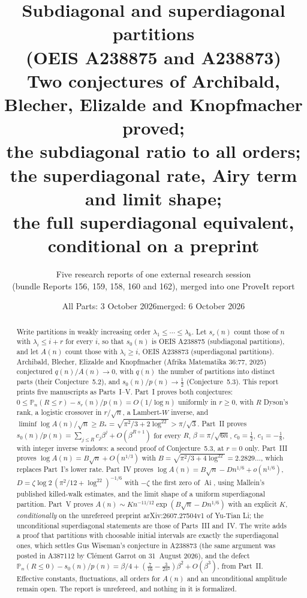 \documentclass[11pt,letterpaper]{article}
\title{\textbf{Subdiagonal and superdiagonal partitions\\ (OEIS A238875 and A238873)}\\[7pt]
\large Two conjectures of Archibald, Blecher, Elizalde and Knopfmacher proved;\\ the subdiagonal ratio to all orders; the superdiagonal rate, Airy term and limit shape;\\ the full superdiagonal equivalent, conditional on a preprint}
\author{Five research reports of one external research session\\(bundle Reports 156, 159, 158, 160 and 162), merged into one ProveIt report}
\date{All Parts: 3 October 2026\quad merged: 6 October 2026}
\numberwithin{equation}{section}
\theoremstyle{remark}\newtheorem{remark}[theorem]{Remark}
\begin{document}
\hypersetup{pageanchor=false}
\maketitle
\begin{abstract}
Write partitions in weakly increasing order $\lambda_1\le\cdots\le\lambda_k$. Let $s_r(n)$ count those of $n$ with $\lambda_i\le i+r$ for every $i$, so that $s_0(n)$ is OEIS A238875 (subdiagonal partitions), and let $A(n)$ count those with $\lambda_i\ge i$, OEIS A238873 (superdiagonal partitions). Archibald, Blecher, Elizalde and Knopfmacher (Afrika Matematika 36:77, 2025) conjectured $q(n)/A(n)\to0$, with $q(n)$ the number of partitions into distinct parts (their Conjecture~5.2), and $s_0(n)/p(n)\to\frac12$ (Conjecture~5.3). This report prints five manuscripts as Parts~I--V. Part~I proves both conjectures: $0\le\mathbb P_n(R\le r)-s_r(n)/p(n)=O(1/\log n)$ uniformly in $r\ge0$, with $R$ Dyson's rank, a logistic crossover in $r/\sqrt n$, a Lambert-$W$ inverse, and $\liminf\log A(n)/\sqrt n\ge B_*=\sqrt{\pi^2/3+2\log^22}>\pi/\sqrt3$. Part~II proves $s_0(n)/p(n)=\sum_{j\le R}c_j\beta^j+O(\beta^{R+1})$ for every $R$, $\beta=\pi/\sqrt{6n}$, $c_0=\frac12$, $c_1=-\frac18$, with integer inverse windows: a second proof of Conjecture~5.3, at $r=0$ only. Part~III proves $\log A(n)=B\sqrt n+O(n^{1/3})$ with $B=\sqrt{\pi^2/3+4\log^22}=2.2829\ldots$, which replaces Part~I's lower rate. Part~IV proves $\log A(n)=B\sqrt n-Dn^{1/6}+o(n^{1/6})$, $D=\zeta\log2\,(\pi^2/12+\log^22)^{-1/6}$ with $-\zeta$ the first zero of $\operatorname{Ai}$, using Mallein's published killed-walk estimates, and the limit shape of a uniform superdiagonal partition. Part~V proves $A(n)\sim Kn^{-11/12}\exp(B\sqrt n-Dn^{1/6})$ with an explicit $K$, \emph{conditionally} on the unrefereed preprint arXiv:2607.27504v1 of Yu-Tian Li; the unconditional superdiagonal statements are those of Parts~III and~IV. The write adds a proof that partitions with choosable initial intervals are exactly the superdiagonal ones, which settles Gus Wiseman's conjecture in A238873 (the same argument was posted in A387112 by Clément Garrot on 31~August 2026), and the defect $\mathbb P_n(R\le0)-s_0(n)/p(n)=\beta/4+(\frac7{16}-\frac3{2\pi^2})\beta^2+O(\beta^3)$, from Part~II. Effective constants, fluctuations, all orders for $A(n)$ and an unconditional amplitude remain open. The report is unrefereed, and nothing in it is formalized.
\end{abstract}
\hypersetup{pageanchor=true}
{\small\setlength{\parskip}{0pt}\tableofcontents}
\newpage
\end{document}

